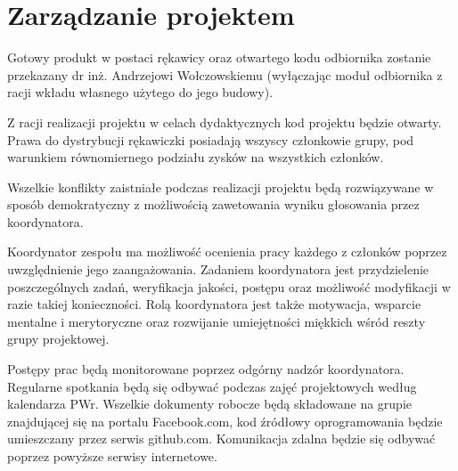 \section{Zarządzanie projektem}
\label{sec:zarzadzanie_projektem} %
Gotowy produkt w postaci rękawicy oraz otwartego kodu odbiornika zostanie przekazany dr inż. Andrzejowi Wołczowskiemu (wyłączając moduł odbiornika z racji wkładu własnego użytego do jego budowy).

Z racji realizacji projektu w celach dydaktycznych kod projektu będzie otwarty. Prawa do dystrybucji rękawiczki posiadają wszyscy członkowie grupy, pod warunkiem równomiernego podziału zysków na wszystkich członków.

Wszelkie konflikty zaistniałe podczas realizacji projektu będą rozwiązywane w sposób demokratyczny z możliwością zawetowania wyniku głosowania przez koordynatora.

Koordynator zespołu ma możliwość ocenienia pracy każdego z członków poprzez uwzględnienie jego zaangażowania. Zadaniem koordynatora jest przydzielenie poszczególnych zadań, weryfikacja jakości, postępu oraz możliwość modyfikacji w razie takiej konieczności. Rolą koordynatora jest także motywacja, wsparcie mentalne i merytoryczne oraz rozwijanie umiejętności miękkich wśród reszty grupy projektowej.

Postępy prac będą monitorowane poprzez odgórny nadzór koordynatora. Regularne spotkania będą się odbywać podczas zajęć projektowych według kalendarza PWr. Wszelkie dokumenty robocze będą składowane na grupie znajdującej się na portalu Facebook.com, kod źródłowy oprogramowania będzie umieszczany przez serwis github.com. Komunikacja zdalna będzie się odbywać poprzez powyższe serwisy internetowe. 
